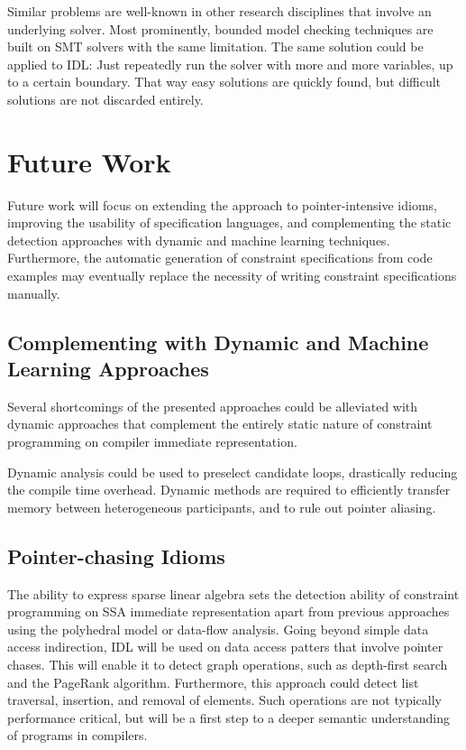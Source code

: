     Similar problems are well-known in other research disciplines that involve
    an underlying solver.
    Most prominently, bounded model checking techniques are built on SMT solvers
    with the same limitation.
    The same solution could be applied to IDL: Just repeatedly run the solver
    with more and more variables, up to a certain boundary.
    That way easy solutions are quickly found, but difficult solutions are not
    discarded entirely.

\section{Future Work}

    Future work will focus on extending the approach to pointer-intensive
    idioms, improving the usability of specification languages, and
    complementing the static detection approaches with dynamic and
    machine learning techniques.
    Furthermore, the automatic generation of constraint specifications from
    code examples may eventually replace the necessity of writing constraint
    specifications manually.

\subsection*{Complementing with Dynamic and Machine Learning Approaches}

    Several shortcomings of the presented approaches could be alleviated with
    dynamic approaches that complement the entirely static nature of constraint
    programming on compiler immediate representation.

    Dynamic analysis could be used to preselect candidate loops, drastically
    reducing the compile time overhead.
    Dynamic methods are required to efficiently transfer memory between
    heterogeneous participants, and to rule out pointer aliasing.

\subsection*{Pointer-chasing Idioms}

    The ability to express sparse linear algebra sets the detection ability of
    constraint programming on SSA immediate representation apart from previous
    approaches using the polyhedral model or data-flow analysis.
    Going beyond simple data access indirection, IDL will be used on data access
    patters that involve pointer chases.
    This will enable it to detect graph operations, such as depth-first search
    and the PageRank algorithm.
    Furthermore, this approach could detect list traversal, insertion, and
    removal of elements.
    Such operations are not typically performance critical, but will be a first
    step to a deeper semantic understanding of programs in compilers.

